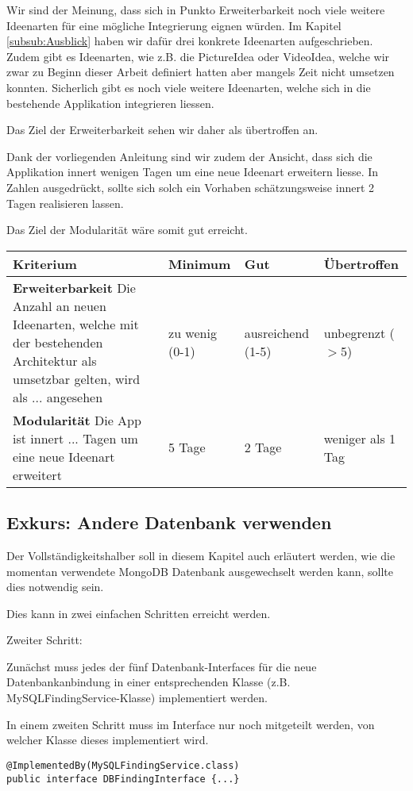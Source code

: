 Wir sind der Meinung, dass sich in Punkto Erweiterbarkeit noch viele weitere Ideenarten für eine mögliche Integrierung eignen würden. Im Kapitel \ref{subsub:Ausblick} haben wir dafür drei konkrete Ideenarten aufgeschrieben. Zudem gibt es Ideenarten, wie z.B. die PictureIdea oder VideoIdea, welche wir zwar zu Beginn dieser Arbeit definiert hatten aber mangels Zeit nicht umsetzen konnten. Sicherlich gibt es noch viele weitere Ideenarten, welche sich in die bestehende Applikation integrieren liessen.

Das Ziel der Erweiterbarkeit sehen wir daher als übertroffen an.

Dank der vorliegenden Anleitung sind wir zudem der Ansicht, dass sich die Applikation innert wenigen Tagen um eine neue Ideenart erweitern liesse. In Zahlen ausgedrückt, sollte sich solch ein Vorhaben schätzungsweise innert 2 Tagen realisieren lassen. 

Das Ziel der Modularität wäre somit gut erreicht.

\begin{center}
    \begin{tabular}{ | p{6cm} | p{2.5cm} | p{2.5cm} | p{2.5cm} |}
    	\hline
    Kriterium & Minimum & Gut & Übertroffen \\ 
    	\hline
    \textbf{Erweiterbarkeit} \newline Die Anzahl an neuen Ideenarten, welche mit der bestehenden Architektur als umsetzbar gelten, wird als ... angesehen & zu wenig (0-1) & ausreichend (1-5) & unbegrenzt ($>$5)\\
    	\hline
    \textbf{Modularität} \newline Die App ist innert ... Tagen um eine neue Ideenart erweitert & 5 Tage & 2 Tage & weniger als 1 Tag \\
    	\hline
    \end{tabular}
\end{center}

\subsection{Exkurs: Andere Datenbank verwenden}
Der Vollständigkeitshalber soll in diesem Kapitel auch erläutert werden, wie die momentan verwendete MongoDB Datenbank ausgewechselt werden kann, sollte dies notwendig sein.

Dies kann in zwei einfachen Schritten erreicht werden.

\begin{labeling}{Zweiter Schritt:}
	\item [Erster Schritt:] Zunächst muss jedes der fünf Datenbank-Interfaces für die neue Datenbankanbindung in einer entsprechenden Klasse (z.B. MySQL\-Finding\-Service-Klasse) implementiert werden. 
	\item [Zweiter Schritt:] In einem zweiten Schritt muss im Interface nur noch mitgeteilt werden, von welcher Klasse dieses implementiert wird.

\begin{lstlisting}[caption={Andere Datenbank verwenden}, label=changeDatabase]
@ImplementedBy(MySQLFindingService.class)
public interface DBFindingInterface {...}
\end{lstlisting}
\end{labeling}
